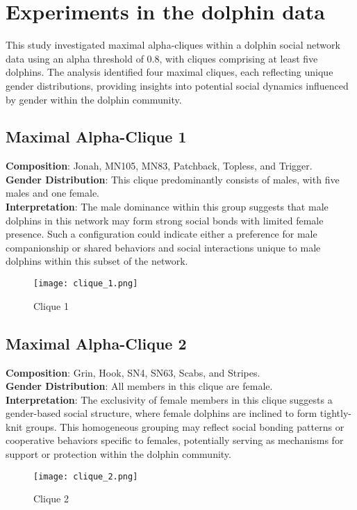 \section{Experiments in the dolphin data}
This study investigated maximal alpha-cliques within a dolphin social network data using an alpha threshold of 0.8, with cliques comprising at least five dolphins. The analysis identified four maximal cliques, each reflecting unique gender distributions, providing insights into potential social dynamics influenced by gender within the dolphin community.

\subsection{Maximal Alpha-Clique 1}
\textbf{Composition}: Jonah, MN105, MN83, Patchback, Topless, and Trigger. \\
\textbf{Gender Distribution}: This clique predominantly consists of males, with five males and one female. \\
\textbf{Interpretation}: The male dominance within this group suggests that male dolphins in this network may form strong social bonds with limited female presence. Such a configuration could indicate either a preference for male companionship or shared behaviors and social interactions unique to male dolphins within this subset of the network.
\begin{figure}[H]
    \centering
    \texttt{[image: clique\_1.png]}
    \caption{Clique 1}
    \label{fig:clique_1}
\end{figure}

\subsection{Maximal Alpha-Clique 2}
\textbf{Composition}: Grin, Hook, SN4, SN63, Scabs, and Stripes. \\
\textbf{Gender Distribution}: All members in this clique are female. \\
\textbf{Interpretation}: The exclusivity of female members in this clique suggests a gender-based social structure, where female dolphins are inclined to form tightly-knit groups. This homogeneous grouping may reflect social bonding patterns or cooperative behaviors specific to females, potentially serving as mechanisms for support or protection within the dolphin community.
\begin{figure}[H]
    \centering
    \texttt{[image: clique\_2.png]}
    \caption{Clique 2}
    \label{fig:clique_2}
\end{figure}

